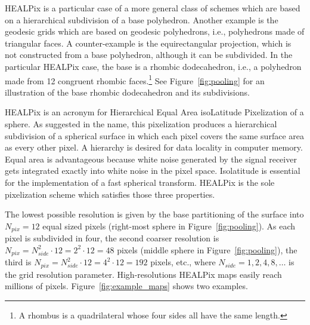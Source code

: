 \documentclass[final,twocolumn,3p,times,authoryear]{elsarticle}
\newcommand{\nati}[1]{{\color[rgb]{.1,.6,.1}{#1}}}
\newcommand{\figref}[1]{Figure~\ref{fig:#1}}
\newcommand{\1}{\b{1}}              %
\newcommand{\0}{\b{0}}              %
\begin{document}
HEALPix is a particular case of a more general class of schemes which are based on a hierarchical subdivision of a base polyhedron.
Another example is the geodesic grids which are based on geodesic polyhedrons, i.e., polyhedrons made of triangular faces. A counter-example is the equirectangular projection, which is not constructed from a base polyhedron, although it can be subdivided.
In the particular HEALPix case, the base is a rhombic dodecahedron, i.e., a polyhedron made from 12 congruent rhombic faces.\footnote{A rhombus is a quadrilateral whose four sides all have the same length.} See \figref{pooling} for an illustration of the base rhombic dodecahedron and its subdivisions.

HEALPix is an acronym for Hierarchical Equal Area isoLatitude Pixelization of a sphere. As suggested in the name, this pixelization produces a hierarchical subdivision of a spherical surface in which each pixel covers the same surface area as every other pixel.
A hierarchy is desired for data locality in computer memory. Equal area is advantageous because white noise generated by the signal receiver gets integrated exactly into white noise in the pixel space. Isolatitude is essential for the implementation of a fast spherical transform. HEALPix is the sole pixelization scheme which satisfies those three properties.

The lowest possible resolution is given by the base partitioning of the surface into $N_{pix} = 12$ equal sized pixels (right-most sphere in \figref{pooling}). As each pixel is subdivided in four, the second coarser resolution is $N_{pix} = N_{side}^2 \cdot 12 = 2^2 \cdot 12 = 48$ pixels (middle sphere in \figref{pooling}), the third is $N_{pix} = N_{side}^2 \cdot 12 = 4^2 \cdot 12 = 192$ pixels, etc., where $N_{side} = 1, 2, 4, 8, \ldots$ is the grid resolution parameter.
High-resolutions HEALPix maps easily reach millions of pixels. \figref{example_maps} shows two examples.
\nati{The figure is beautiful, but should we really show it? If we target cosmologists, we can simply list some type of data. If we target a broader audience, maybe it makes sense to provide some illustration.}
\end{document}
